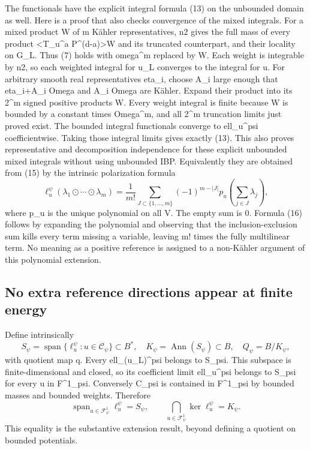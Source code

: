\documentclass[
]{article}
\begin{document}
The functionals have the explicit integral formula (13) on the unbounded
domain as well. Here is a proof that also checks convergence of the
mixed integrals. For a mixed product W of m Kähler representatives, n2
gives the full mass of every product \textless T\_u\^{}a
P\^{}(d-a)\textgreater W and its truncated counterpart, and their
locality on G\_L. Thus (7) holds with omega\^{}m replaced by W. Each
weight is integrable by n2, so each weighted integral for u\_L converges
to the integral for u. For arbitrary smooth real representatives eta\_i,
choose A\_i large enough that eta\_i+A\_i Omega and A\_i Omega are
Kähler. Expand their product into its 2\^{}m signed positive products W.
Every weight integral is finite because W is bounded by a constant times
Omega\^{}m, and all 2\^{}m truncation limits just proved exist. The
bounded integral functionals converge to ell\_u\^{}psi coefficientwise.
Taking those integral limits gives exactly (13). This also proves
representative and decomposition independence for these explicit
unbounded mixed integrals without using unbounded IBP. Equivalently they
are obtained from (15) by the intrinsic polarization formula \[
\ell_u^\psi(\lambda_1\odot\cdots\odot\lambda_m)
=\frac1{m!}\sum_{J\subset\{1,\ldots,m\}}(-1)^{m-|J|}
p_u\!\left(\sum_{j\in J}\lambda_j\right),\tag{16}
\] where p\_u is the unique polynomial on all V. The empty sum is 0.
Formula (16) follows by expanding the polynomial and observing that the
inclusion-exclusion sum kills every term missing a variable, leaving m!
times the fully multilinear term. No meaning as a positive reference is
assigned to a non-Kähler argument of this polynomial extension.

\subsection{No extra reference directions appear at finite
energy}\label{no-extra-reference-directions-appear-at-finite-energy}

Define intrinsically \[
S_\psi=\operatorname{span}\{\ell_u^\psi:u\in\mathcal{C}_\psi\}\subset B^*,
\quad K_\psi=\operatorname{Ann}(S_\psi)\subset B,
\quad Q_\psi=B/K_\psi,
\] with quotient map q. Every ell\_(u\_L)\^{}psi belongs to S\_psi. This
subspace is finite-dimensional and closed, so its coefficient limit
ell\_u\^{}psi belongs to S\_psi for every u in F\^{}1\_psi. Conversely
C\_psi is contained in F\^{}1\_psi by bounded masses and bounded
weights. Therefore \[
\operatorname{span}_{u\in\mathcal{F}^1_\psi}\ell_u^\psi=S_\psi,
\qquad
\bigcap_{u\in\mathcal{F}^1_\psi}\ker\ell_u^\psi=K_\psi.\tag{17}
\] This equality is the substantive extension result, beyond defining a
quotient on bounded potentials.
\end{document}
